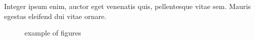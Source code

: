 \section*{}


Integer ipsum enim, auctor eget venenatis quis, pellentesque vitae sem. Mauris egestas eleifend dui vitae ornare.

\begin{figure}[h]
\begin{center}
\caption{ example of figures}
\end{center}
\end{figure}

